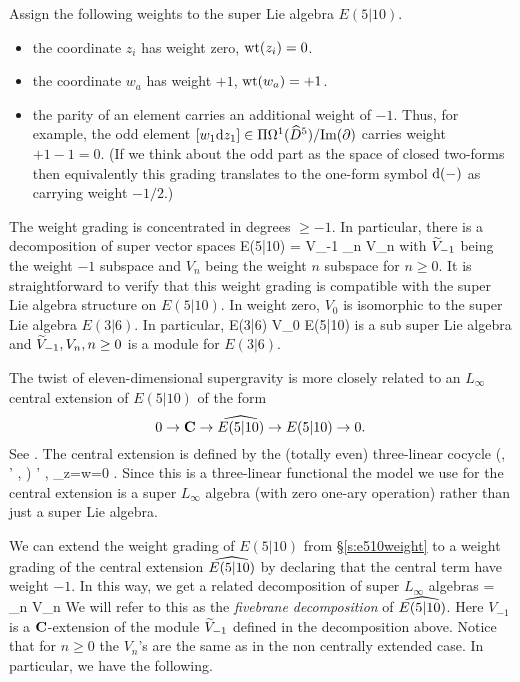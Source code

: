 Assign the following weights to the super Lie algebra $E(5|10)$. 
\begin{itemize} 
\item the coordinate $z_i$ has weight zero, $\wt(z_i) = 0$. 
\item the coordinate $w_a$ has weight $+1$, $\wt(w_a) = +1$. 
\item the parity of an element carries an additional weight of $-1$. 
Thus, for example, the odd element $[w_1 \d z_1] \in \Pi \Omega^1(\Hat{D}^5)/{\rm Im}(\del)$ carries weight $+1 - 1 = 0$. 
(If we think about the odd part as the space of closed two-forms then equivalently this grading translates to the one-form symbol $\d(-)$ as carrying weight $-1/2$.)
\end{itemize} 
The weight grading is concentrated in degrees $\geq -1$. 
In particular, there is a decomposition of super vector spaces
\beqn\label{eqn:decomp1}
E(5|10) = \til V_{-1} \times \prod_{n } V_n 
\eeqn
with $\til V_{-1}$ being the weight $-1$ subspace and $V_n$ being the weight $n$ subspace for $n \geq 0$.  
It is straightforward to verify that this weight grading is compatible with the super Lie algebra structure on $E(5|10)$. 
In weight zero, $V_0$ is isomorphic to the super Lie algebra $E(3|6)$.
In particular, 
\beqn 
\label{eqn:e36iso}
E(3|6) \cong V_0 \subset E(5|10)
\eeqn
is a sub super Lie algebra and $\til{V}_{-1}, V_n, n \geq 0$ is a module for $E(3|6)$. 

\parsec[s:e510central]

The twist of eleven-dimensional supergravity is more closely related to an $L_\infty$ central extension of $E(5|10)$ of the form
\[
0 \to \C \to \Hat{E(5|10)} \to E(5|10) \to 0 .
\]
See \cite[\S 3]{RSW}. 
The central extension is defined by the (totally even) three-linear cocycle
\beqn\label{eqn:e510central}
(\mu, \mu' , \alpha) \mapsto \<\mu \wedge \mu' , \alpha\>_{z=w=0} \in \C .
\eeqn
Since this is a three-linear functional the model we use for the central extension is a super $L_\infty$ algebra (with zero one-ary operation) rather than just a super Lie algebra.

We can extend the weight grading of $E(5|10)$ from \S \ref{s:e510weight} to a weight grading of the central extension $\Hat{E(5|10)}$ by declaring that the central term have weight $-1$.
In this way, we get a related decomposition of super $L_\infty$ algebras
\beqn\label{eqn:decomp1}
 = \prod_{n } V_n
\eeqn
We will refer to this as the \textit{fivebrane decomposition} of $\Hat{E(5|10)}$.
Here $V_{-1}$ is a $\C$-extension of the module $\til V_{-1}$ defined in the decomposition above.
Notice that for $n \geq 0$ the $V_n$'s are the same as in the non centrally extended case.
In particular, we have the following. 


